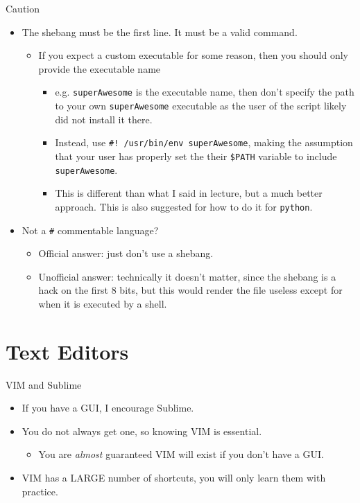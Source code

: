 \documentclass[11pt]{beamer}
\begin{document}
\begin{frame}[fragile]{Caution}
  \begin{itemize}[<+- | alert@+>]
    \item The shebang must be the first line.  It must be a valid command.
    \begin{itemize}[<+- | alert@+>]
      \item If you expect a custom executable for some reason, then you should only provide the executable name
      \begin{itemize}[<+- | alert@+>]
        \item e.g. \texttt{superAwesome} is the executable name, then don't specify the path to your own
              \texttt{superAwesome} executable as the user of the script likely did not install it there.
        \item Instead, use \texttt{\#! /usr/bin/env superAwesome}, making the assumption that your user has
              properly set the their \texttt{\$PATH} variable to include \texttt{superAwesome}.
        \item This is different than what I said in lecture, but a much better approach.  This is also suggested
              for how to do it for \texttt{python}.
      \end{itemize}
    \end{itemize}
    \item Not a \texttt{\#} commentable language?
    \begin{itemize}[<+- | alert@+>]
      \item Official answer: just don't use a shebang.
      \item Unofficial answer: technically it doesn't matter, since the shebang is a hack on the first 8 bits,
            but this would render the file useless except for when it is executed by a shell.
    \end{itemize}
  \end{itemize}
\end{frame}

%

%
\section{Text Editors}
\label{sec:text_editors}

\begin{frame}[fragile]{VIM and Sublime}
  \begin{itemize}[<+- | alert@+>]
    \item If you have a GUI, I encourage Sublime.
    \item You do not always get one, so knowing VIM is essential.
    \begin{itemize}[<+- | alert@+>]
      \item You are \emph{almost} guaranteed VIM will exist if you don't have a GUI.
    \end{itemize}
    \item VIM has a LARGE number of shortcuts, you will only learn them with practice.
  \end{itemize}
\end{frame}
\end{document}
